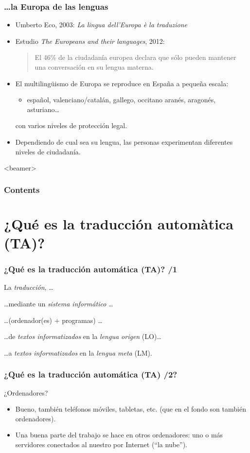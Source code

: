 \documentclass{beamer}
\newcommand{\empha}[1]{\emph{#1}\/}
\begin{document}
\begin{frame}
\frametitle{\ldots la Europa de las lenguas}
\begin{itemize}
\item Umberto Eco, 2003: \emph{La lingua dell'Europa è la traduzione}
\item Estudio \emph{The Europeans and their languages}, 2012:
\begin{quote}
El 46\% de la ciudadanía europea declara que sólo pueden mantener una conversación en su lengua materna.
\end{quote}
\item El multilingüismo de Europa se reproduce en España a pequeña escala:
\begin{itemize}
\item español, valenciano/catalán, gallego, occitano aranés, aragonés, asturiano\ldots
\end{itemize}
con varios niveles de protección legal.
\item Dependiendo de cual sea su lengua, las personas experimentan diferentes niveles de ciudadanía.
\end{itemize}

\end{frame}




\begin{frame}<beamer>
\frametitle{Contents}
\tableofcontents
\end{frame}


\section{¿Qué es la traducción automàtica (TA)?}
\begin{frame}
\frametitle{¿Qué es la traducción automática (TA)? /1}

{
{La \empha{traducción}, \ldots }
\pause

{\ldots mediante un \empha{sistema informático} \ldots}
\pause

{\ldots (ordenador(es) +
  programas) \ldots}
\pause

{\ldots de \empha{textos informatizados} en la \empha{lengua
    origen} (LO)\ldots}
\pause

{\ldots a \empha{textos informatizados} en la \empha{lengua meta}
  (LM).}

}
\end{frame}

\begin{frame}
  
\frametitle{¿Qué es la traducción automática (TA) /2?}

¿Ordenadores?
\begin{itemize}
\item Bueno, también teléfonos móviles, tabletas, etc. (que en el fondo son también ordenadores). 
\item Una buena parte del trabajo se hace en otros ordenadores: uno o
  más servidores conectados al nuestro por Internet (``la nube'').
\end{itemize}
\end{frame}
\end{document}
